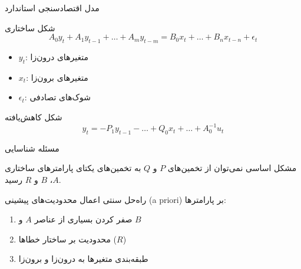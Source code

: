 \documentclass[aspectratio=169,11pt]{beamer}
\begin{document}
\begin{frame}{مدل اقتصادسنجی استاندارد}
	\begin{block}{شکل ساختاری}
		\[
			A_0 y_t + A_1 y_{t-1} + \ldots + A_m y_{t-m} = B_0 x_t + \ldots + B_n x_{t-n} + \epsilon_t
		\]
	\end{block}
	\begin{itemize}
		\item $y_t$: متغیرهای درون‌زا
		\item $x_t$: متغیرهای برون‌زا
		\item $\epsilon_t$: شوک‌های تصادفی
	\end{itemize}
	\vspace{0.3cm}
	\begin{exampleblock}{شکل کاهش‌یافته}
		\[
			y_t = -P_1 y_{t-1} - \ldots + Q_0 x_t + \ldots + A_0^{-1} u_t
		\]
	\end{exampleblock}
\end{frame}

\begin{frame}{مسئله شناسایی}
	\begin{alertblock}{مشکل اساسی}
		\centering
		\large
		نمی‌توان از تخمین‌های $P$ و $Q$ به تخمین‌های یکتای پارامترهای ساختاری $A$، $B$ و $R$ رسید.
	\end{alertblock}
	\vspace{0.3cm}
	\begin{block}{راه‌حل سنتی}
		اعمال محدودیت‌های پیشینی (a priori) بر پارامترها:
		\begin{enumerate}
			\item صفر کردن بسیاری از عناصر $A$ و $B$
			\item محدودیت بر ساختار خطاها ($R$)
			\item طبقه‌بندی متغیرها به درون‌زا و برون‌زا
		\end{enumerate}
	\end{block}
\end{frame}
\end{document}
